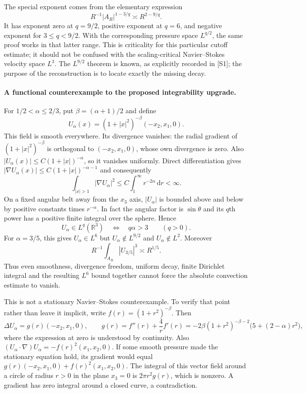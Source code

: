 \documentclass[11pt]{article}
\begin{document}
The special exponent comes from the elementary expression
\[
 R^{-1}|A_R|^{1-3/q}\asymp R^{2-9/q}.
\]
It has exponent zero at $q=9/2$, positive exponent at $q=6$, and
negative exponent for $3\leq q<9/2$. With the corresponding pressure
space $L^{q/2}$, the same proof works in that latter range. This is
criticality for this particular cutoff estimate; it should not be confused
with the scaling-critical Navier--Stokes velocity space $L^3$.
The $L^{9/2}$ theorem is known, as explicitly recorded in [S1]; the
purpose of the reconstruction is to locate exactly the missing decay.

\paragraph{A functional counterexample to the proposed integrability upgrade.}
For $1/2<\alpha\leq2/3$, put $\beta=(\alpha+1)/2$ and define
\begin{equation}\label{ra487:swirl}
 U_\alpha(x)=(1+|x|^2)^{-\beta}(-x_2,x_1,0).
\end{equation}
This field is smooth everywhere. Its divergence vanishes: the radial
gradient of $(1+|x|^2)^{-\beta}$ is orthogonal to $(-x_2,x_1,0)$,
whose own divergence is zero. Also $|U_\alpha(x)|\leq C(1+|x|)^{-\alpha}$,
so it vanishes uniformly. Direct differentiation gives
$|\nabla U_\alpha(x)|\leq C(1+|x|)^{-\alpha-1}$ and consequently
\[
 \int_{|x|>1}|\nabla U_\alpha|^2
 \leq C\int_1^\infty r^{-2\alpha}\,\mathrm dr<\infty.
\]
On a fixed angular belt away from the $x_3$ axis,
$|U_\alpha|$ is bounded above and below by positive constants times
$r^{-\alpha}$. In fact the angular factor is $\sin\theta$ and its
$q$th power has a positive finite integral over the sphere. Hence
\begin{equation}\label{ra487:swirlintegrability}
 U_\alpha\in L^q(\mathbb R^3)
        \quad\Longleftrightarrow\quad q\alpha>3
                 \qquad(q>0).
\end{equation}
For $\alpha=3/5$, this gives $U_\alpha\in L^6$ but
$U_\alpha\notin L^{9/2}$ and $U_\alpha\notin L^2$.
Moreover
\[
 R^{-1}\int_{A_R}|U_{3/5}|^3\asymp R^{1/5}.
\]
Thus even smoothness, divergence freedom, uniform decay, finite Dirichlet
integral and the resulting $L^6$ bound together cannot force the
absolute convection estimate to vanish.

This is not a stationary Navier--Stokes counterexample. To verify that
point rather than leave it implicit, write $f(r)=(1+r^2)^{-\beta}$.
Then
\[
 \Delta U_\alpha=g(r)(-x_2,x_1,0),\qquad
 g(r)=f''(r)+\frac4r f'(r)
 =-2\beta(1+r^2)^{-\beta-2}
       \bigl(5+(2-\alpha)r^2\bigr),
\]
where the expression at zero is understood by continuity. Also
$(U_\alpha\cdot\nabla)U_\alpha=-f(r)^2(x_1,x_2,0)$.
If some smooth pressure made the stationary equation hold, its gradient
would equal
$g(r)(-x_2,x_1,0)+f(r)^2(x_1,x_2,0)$.
The integral of this vector field around a circle of radius $r>0$ in
the plane $x_3=0$ is $2\pi r^2g(r)$, which is nonzero. A gradient has
zero integral around a closed curve, a contradiction.
\end{document}
